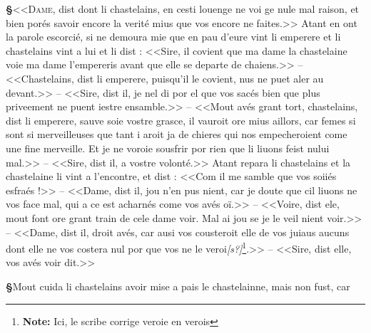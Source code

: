 \documentclass[12pt]{article} %
\newcommand{\colmar}[1]{\marginnote{[#1]}}          %
\newcommand{\supplied}[1]{\textlangle#1\textrangle} %
\newcommand{\uncertain}[1]{\textit{[#1?]}} %
\newcommand{\fnnote}[1]{\footnote{\textbf{Note:} #1}} %
\newcounter{paranum}
\newcommand{\pnum}{\stepcounter{paranum}\textbf{§\arabic{paranum}}\quad}
\begin{document}
\pnum <<\lettrine[lines=2]{\color{darkblue}D}{ame}, dist dont li chastelains, en cesti louenge ne voi ge nule mal raison, et bien porés savoir encore la verité mius que vos encore ne faites.>> Atant en ont la parole escorcié, si ne demoura mie que en pau d'eure vint li emperere et li chastelains vint a lui et li dist : <<Sire, il covient que ma dame la chastelaine voie ma dam\supplied{e} l'empereris avant que elle se departe de chaiens.>> -- <<Chastelains, dist li emperere, puisqu'il le covient, nus ne puet \colmar{12vb}\colmar{b} aler au devant.>> -- <<Sire, dist il, je nel di por el que vos sacés bien que plus priveement ne puent iestre ensamble.>> -- <<Mout avés grant tort, chastelains, dist li emperere, sauve soie v\supplied{ost}re grasce, il vauroit ore mius aillors, car femes si sont si merveilleuses que tant i aroit ja de chieres qui nos empecheroient come une fine merveille. Et je ne voroie sousfrir por rien que li liuons feist nului mal.>> -- <<Sire, dist il, a vostre volonté.>> Atant repara li chastelains et la chastelaine li vint a l'encontre, et dist : <<Com il me samble que vos soiiés esfraés !>> -- <<Dame, dist il, jou n'en pus nient, car je doute que cil liuons ne vos face mal, qui a ce est acharnés come vos avés oï.>> -- <<Voire, dist ele, mout font ore grant train de cele dame voir. Mal ai jou se je le veil nient voir.>> -- <<Dame, dist il, droit avés, car ausi vos cousteroit elle de vos juiaus aucuns dont elle ne vos costera nul por que vos ne le veroi\uncertain{s}\fnnote{Ici, le scribe corrige veroie en verois}.>> -- <<Sire, dist elle, vos avés voir dit.>>


\pnum Mout cuida li chastelains avoir mise a pais le chastelainne, mais non fust, car
\end{document}
